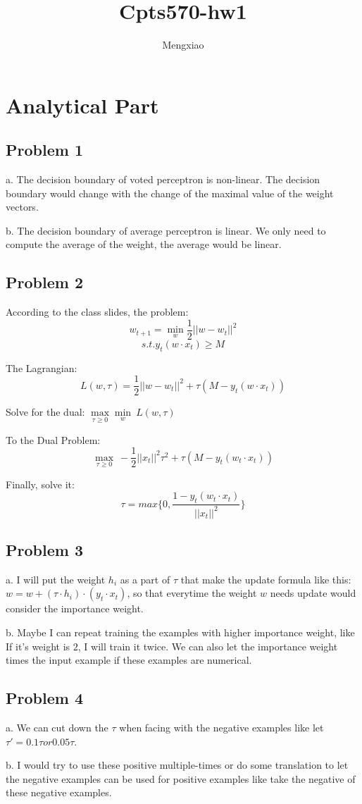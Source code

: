 \documentclass[12pt]{article}
\author{Mengxiao}
\title{Cpts570-hw1}
\begin{document}
	\maketitle
	\pagebreak
	\section{Analytical Part}
		\subsection{Problem 1}
			\par a. The decision boundary of voted perceptron is non-linear. The decision boundary would change with the change of the maximal value of the weight vectors.
			\par b. The decision boundary of average perceptron is linear.	We only need to compute the average of the weight, the average would be linear.
		\subsection{Problem 2}
			\par According to the class slides, the problem:
$$ w_{t+1} = \min\limits_w\frac{1}{2} ||w-w_t||^2$$
$$ s.t. y_t(w\cdot x_t)\geq M$$
			\par The Lagrangian:
$$ L(w,\tau)=\frac{1}{2} ||w-w_t||^2+\tau(M-y_t(w\cdot x_t)) $$
			\par Solve for the dual:	$\max\limits_{\tau\ge0}\min\limits_w\ L(w,\tau)$
			\par To the Dual Problem:
$$ \max\limits_{\tau\ge0}\ -\frac{1}{2}||x_t||^2\tau^2+\tau(M-y_t(w_t\cdot x_t))$$
			\par Finally, solve it:
$$ \tau = max\{0, \frac{1-y_t(w_t\cdot x_t)}{||x_t||^2}\} $$
		\subsection{Problem 3}
				\par\qquad a. I will put the weight $h_i$ as a part of $\tau$ that make the update formula like this: $w=w+(\tau\cdot h_i)\cdot(y_t\cdot x_t)$, so that everytime the weight $w$ needs update would consider the importance weight.
				\par b. Maybe I can repeat training the examples with higher importance weight, like If it's weight is $2$, I will train it twice. We can also let the importance weight times the input example if these examples are numerical.
		\subsection{Problem 4}
				\par\qquad a. We can cut down the $\tau$ when facing with the negative examples like let $\tau' = 0.1\tau or 0.05\tau$.
				\par b. I would try to use these positive multiple-times or do some translation to let the negative examples can be used for positive examples like take the negative of these negative examples.
\end{document}
